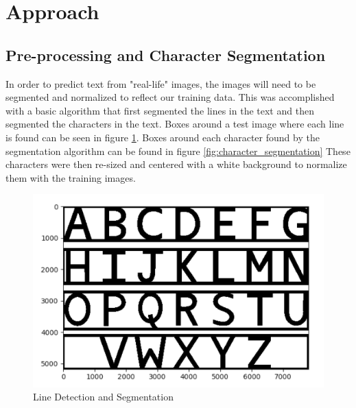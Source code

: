 \documentclass[11pt]{article}
\begin{document}

\section{Approach}

\subsection{Pre-processing and Character Segmentation}
    
    In order to predict text from "real-life" images, the images will need to be segmented and normalized to reflect our training data. This was accomplished with a basic algorithm that first segmented the lines in the text and then segmented the characters in the text. Boxes around a test image where each line is found can be seen in figure \ref{fig:line_segmentation}. Boxes around each character found by the segmentation algorithm can be found in figure \ref{fig:character_segmentation} These characters were then re-sized and centered with a white background to normalize them with the training images.
    
    \begin{figure}
        \centering
        \includegraphics[scale=0.4]{line_segmentation_example.png}
        \caption{Line Detection and Segmentation}
        \label{fig:line_segmentation}
    \end{figure}
    
\end{document}
